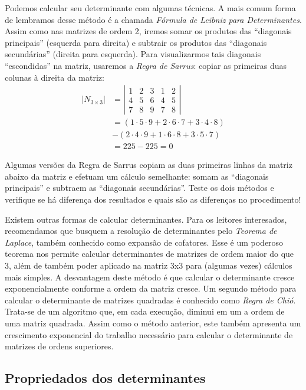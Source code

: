 \documentclass[
  portuguese,
  letterpaper,
  DIV=11,
  numbers=noendperiod]{scrreport}
\begin{document}
Podemos calcular seu determinante com algumas técnicas. A mais comum
forma de lembramos desse método é a chamada \emph{Fórmula de Leibniz
para Determinantes}. Assim como nas matrizes de ordem 2, iremos somar os
produtos das ``diagonais principais'' (esquerda para direita) e subtrair
os produtos das ``diagonais secundárias'' (direita para esquerda). Para
visualizarmos tais diagonais ``escondidas'' na matriz, usaremos a
\emph{Regra de Sarrus}: copiar as primeiras duas colunas à direita da
matriz: \[
\begin{aligned}
    |N_{3\times3}| &=
    \left|\begin{array}{ccc|cc}
        1 & 2 & 3 & 1 & 2 \\ 
        4 & 5 & 6 & 4 & 5 \\
        7 & 8 & 9 & 7 & 8
    \end{array}\right| \\
    &= (1 \cdot 5 \cdot 9 + 2 \cdot 6 \cdot 7 + 3 \cdot 4 \cdot 8) \\
    &- (2 \cdot 4 \cdot 9 + 1 \cdot 6 \cdot 8 + 3 \cdot 5 \cdot 7)\\
    &= 225 - 225 = 0
\end{aligned}
\]

Algumas versões da Regra de Sarrus copiam as duas primeiras linhas da
matriz abaixo da matriz e efetuam um cálculo semelhante: somam as
``diagonais principais'' e subtraem as ``diagonais secundárias''. Teste
os dois métodos e verifique se há diferença dos resultados e quais são
as diferenças no procedimento!

Existem outras formas de calcular determinantes. Para os leitores
interesados, recomendamos que busquem a resolução de determinantes pelo
\emph{Teorema de Laplace}, também conhecido como expansão de cofatores.
Esse é um poderoso teorema nos permite calcular determinantes de
matrizes de ordem maior do que 3, além de também poder aplicado na
matriz 3x3 para (algumas vezes) cálculos mais simples. A desvantagem
deste método é que calcular o determinante cresce exponencialmente
conforme a ordem da matriz cresce. Um segundo método para calcular o
determinante de matrizes quadradas é conhecido como \emph{Regra de
Chió}. Trata-se de um algoritmo que, em cada execução, diminui em um a
ordem de uma matriz quadrada. Assim como o método anterior, este também
apresenta um crescimento exponencial do trabalho necessário para
calcular o determinante de matrizes de ordens superiores.

\subsection{Propriedados dos
determinantes}\label{propriedados-dos-determinantes}
\end{document}
